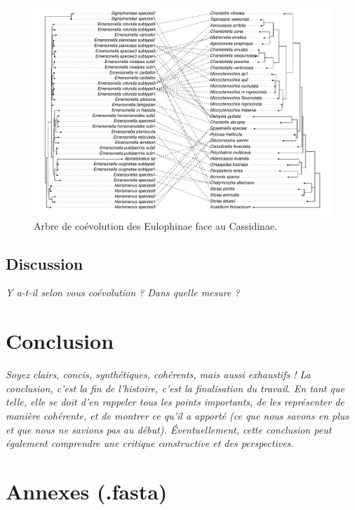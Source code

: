 \documentclass[a4paper, 12pt]{article}
\begin{document}
\begin{landscape}
    \begin{figure}[htbp]
    \centering
    \includegraphics[scale=0.8]{cophylo.pdf}
    \caption{\small Arbre de coévolution des Eulophinae face au Cassidinae.}
    \label{cophylo_tree}
\end{figure}
\end{landscape}

\subsection{Discussion}
\emph{Y a-t-il selon vous coévolution ? Dans quelle mesure ?}
\section{Conclusion}
\emph{Soyez clairs, concis, synthétiques, cohérents, mais aussi exhaustifs ! La conclusion, c’est la fin de l’histoire, c’est la finalisation du travail. En tant que telle, elle se doit d’en rappeler tous les points importants, de les représenter de manière cohérente, et de montrer ce qu’il a apporté (ce que nous savons en plus et que nous ne savions pas au début). Éventuellement, cette conclusion peut également comprendre une critique constructive et des perspectives.}

\printbibliography

\section{Annexes (.fasta)}
\end{document}
